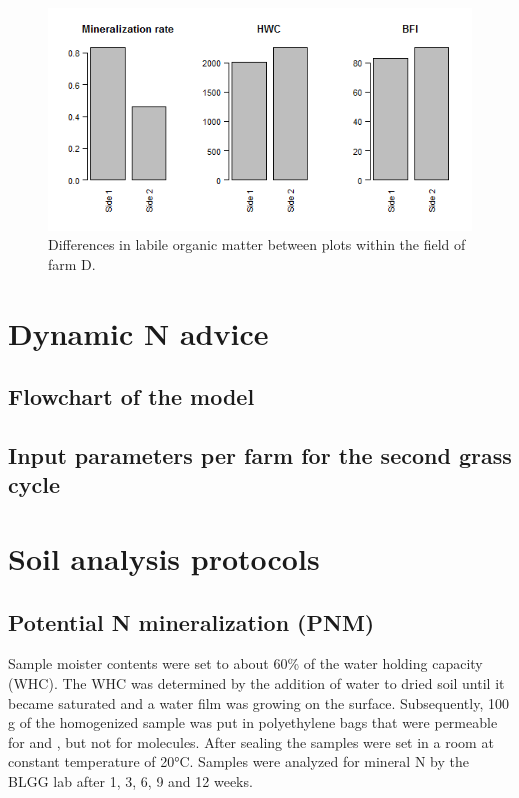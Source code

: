 \documentclass[10pt,twoside,dutch,english]{report}
\begin{document}
\begin{appendices}
\begin{figure}[ht]
			\end{figure}
	\begin{figure}[ht] %
		\centering
		\includegraphics[width=0.7\linewidth]{app_het_F4}
		\caption{Differences in labile organic matter between plots within the field of farm D.}
			\end{figure}


\chapter{Dynamic N advice}
\label{chap: dynN}
\section{Flowchart of the model}

\section{Input parameters per farm for the second grass cycle}

\chapter{Soil analysis protocols}
		\label{chap: Protocols}
\section{Potential N mineralization (PNM)}
Sample moister contents were set to about 60\% of the water holding capacity (WHC). The WHC was determined by the addition of water to dried soil until it became saturated and a water film was growing on the surface. Subsequently, 100 g of the homogenized sample was put in polyethylene bags that were permeable for  and  , but not for  molecules. After sealing the samples were set in a room at constant temperature of 20°C. Samples were analyzed for mineral N by the BLGG lab after 1, 3, 6, 9 and 12 weeks. 


\end{appendices}
\end{document}
